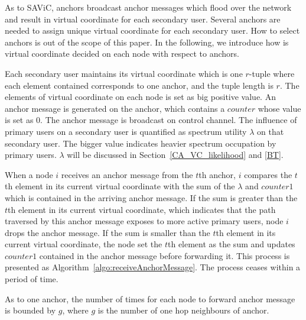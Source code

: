 As to SAViC, anchors broadcast anchor messages which flood over the network and result in virtual coordinate for each secondary user.
Several anchors are needed to assign unique virtual coordinate for each secondary user.
How to select anchors is out of the scope of this paper.
In the following, we introduce how is virtual coordinate decided on each node with respect to anchors.


Each secondary user maintains its virtual coordinate which is one $r$-tuple where each element contained corresponds to one anchor, and the tuple length is $r$.
The elements of virtual coordinate on each node is set as big positive value.
An anchor message is generated on the anchor, which contains a $counter$ whose value is set as 0.
The anchor message is broadcast on control channel.
The influence of primary users on a secondary user is quantified as spectrum utility $\lambda$ on that secondary user.
The bigger value indicates heavier spectrum occupation by primary users.
$\lambda$ will be discussed in Section~\ref{CA_VC_likelihood} and \ref{BT}.

When a node $i$ receives an anchor message from the $t$th anchor, $i$ compares the $t$th element in its current virtual coordinate with the sum of the $\lambda$ and $counter1$ which is contained in the arriving anchor message.
If the sum is greater than the $t$th element in its current virtual coordinate, which indicates that the path traversed by this anchor message exposes to more active primary users, node $i$ drops the anchor message.
If the sum is smaller than the $t$th element in its current virtual coordinate, the node set the $t$th element as the sum and updates $counter1$ contained in the anchor message before forwarding it.
This process is presented as Algorithm~\ref{algo:receiveAnchorMessage}.
The process ceases within a period of time.
\begin{lemma}
\label{savic:lemma1}
As to one anchor, the number of times for each node to forward anchor message is bounded by $g$, where $g$ is the number of one hop neighbours of anchor.
\end{lemma}

